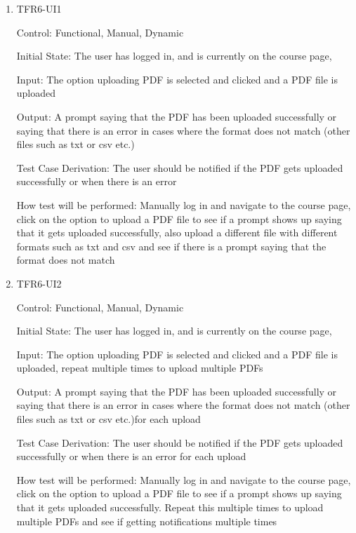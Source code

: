 \documentclass[12pt, titlepage]{article}
\begin{document}
  \begin{enumerate}[resume]
  \item{TFR6-UI1\\} \label{TFR6-UI1}
  
  Control: Functional, Manual, Dynamic
            
  Initial State: The user has logged in, and is currently on the course page,  
            
  Input: The option uploading PDF is selected and clicked and a PDF file is uploaded 
            
  Output: A prompt saying that the PDF has been uploaded successfully or saying that there is an error in cases where the format does not match (other files such as txt or csv etc.)
  
  Test Case Derivation: The user should be notified if the PDF gets uploaded successfully or when there is an error 
            
  How test will be performed: Manually log in and navigate to the course page, click on the option to upload a PDF file to see if a prompt shows up saying that it gets uploaded successfully, also upload a different file with different formats such as txt and csv and see if there is a prompt saying that the format does not match
  \item{TFR6-UI2\\} \label{TFR6-UI2}
  
  Control: Functional, Manual, Dynamic
            
  Initial State: The user has logged in, and is currently on the course page,  
            
  Input: The option uploading PDF is selected and clicked and a PDF file is uploaded, repeat multiple times to upload multiple PDFs
            
  Output: A prompt saying that the PDF has been uploaded successfully or saying that there is an error in cases where the format does not match (other files such as txt or csv etc.)for each upload
  
  Test Case Derivation: The user should be notified if the PDF gets uploaded successfully or when there is an error for each upload
            
  How test will be performed: Manually log in and navigate to the course page, click on the option to upload a PDF file to see if a prompt shows up saying that it gets uploaded successfully. Repeat this multiple times to upload multiple PDFs and see if getting notifications multiple times 
  

\end{enumerate}
\end{document}
